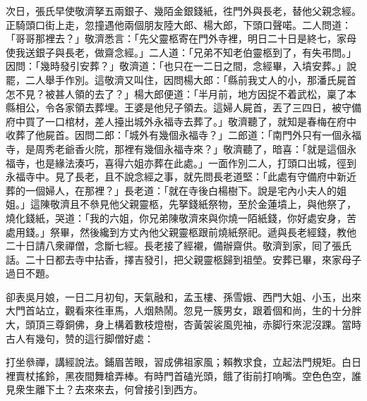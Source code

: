 次日，張氏早使敬濟拏五兩銀子、幾陌金銀錢紙，徃門外與長老，替他父親念經。正騎頭口街上走，忽撞遇他兩個朋友陸大郎、楊大郎，下頭口聲喏。二人問道：「哥哥那裡去？」敬濟悉言：「先父靈柩寄在門外寺裡，明日二十日是終七，家母使我送銀子與長老，做齋念經。」二人道：「兄弟不知老伯靈柩到了，有失弔問。」因問：「幾時發引安葬？」敬濟道：「也只在一二日之間，念經畢，入墳安葬。」說罷，二人舉手作別。這敬濟又叫住，因問楊大郎：「縣前我丈人的小，那潘氏屍首怎不見？被甚人領的去了？」楊大郎便道：「半月前，地方因捉不着武松，稟了本縣相公，令各家領去葬埋。王婆是他兒子領去。這婦人屍首，丟了三四日，被守備府中買了一口棺材，差人擡出城外永福寺去葬了。」敬濟聽了，就知是春梅在府中收葬了他屍首。因問二郎：「城外有幾個永福寺？」二郎道：「南門外只有一個永福寺，是周秀老爺香火院，那裡有幾個永福寺來？」敬濟聽了，暗喜：「就是這個永福寺，也是緣法湊巧，喜得六姐亦葬在此處。」一面作別二人，打頭口出城，徑到永福寺中。見了長老，且不說念經之事，就先問長老道堅：「此處有守備府中新近葬的一個婦人，在那裡？」長老道：「就在寺後白楊樹下。說是宅內小夫人的姐姐。」這陳敬濟且不叅見他父親靈柩，{}先拏錢紙祭物，至於金蓮墳上，與他祭了，燒化錢紙，哭道：「我的六姐，你兄弟陳敬濟來與你燒一陌紙錢，你好處安身，苦處用錢。」祭畢，然後纔到方丈內他父親靈柩跟前燒紙祭祀。遞與長老經錢，教他二十日請八衆禪僧，念斷七經。長老接了經襯，備辦齋供。敬濟到家，囘了張氏話。二十日都去寺中拈香，擇吉發引，把父親靈柩歸到祖塋。安葬已畢，來家母子過日不題。

卻表吳月娘，一日二月初旬，天氣融和，孟玉樓、孫雪娥、西門大姐、小玉，出來大門首站立，觀看來徃車馬，人烟熱鬧。忽見一簇男女，跟着個和尚，生的十分胖大，頭頂三尊銅佛，身上構着數枝燈樹，杏黃袈裟風兜袖，赤脚行來泥沒踝。當時古人有幾句，赞的這行脚僧好處：

\begin{myquote}
打坐叅禪，講經說法。鋪眉苦眼，習成佛祖家風；賴教求食，立起法門規矩。白日裡賣杖搖鈴，黑夜間舞槍弄棒。有時門首磕光頭，餓了街前打响嘴。空色色空，誰見衆生離下土？去來來去，何曾接引到西方。
\end{myquote}

